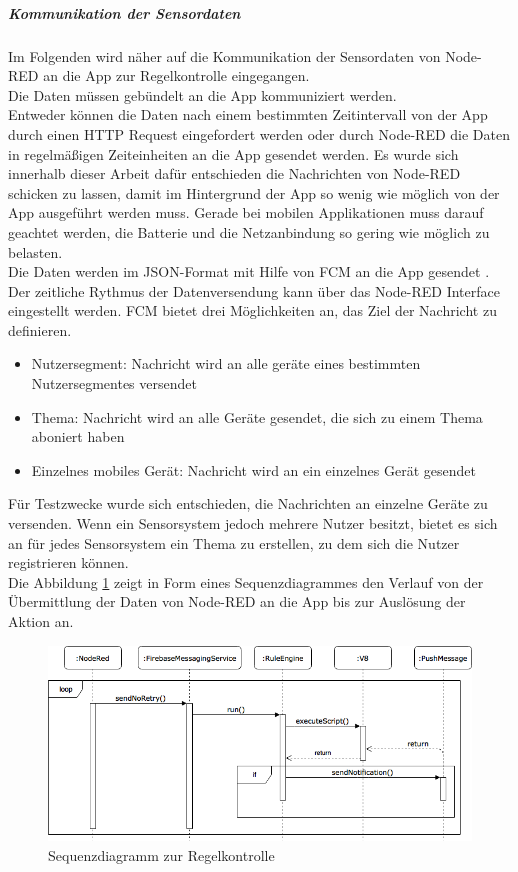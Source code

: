 \subparagraph{Kommunikation der Sensordaten}
Im Folgenden wird näher auf die Kommunikation der Sensordaten von Node-RED an die App zur Regelkontrolle eingegangen.\\
Die Daten müssen gebündelt an die App kommuniziert werden.\\
Entweder können die Daten nach einem bestimmten Zeitintervall von der App durch einen HTTP Request eingefordert werden oder durch Node-RED die Daten in regelmäßigen Zeiteinheiten an die App gesendet werden. Es wurde sich innerhalb dieser Arbeit dafür entschieden die Nachrichten von Node-RED schicken zu lassen, damit im Hintergrund der App so wenig wie möglich von der App ausgeführt werden muss. Gerade bei mobilen Applikationen muss darauf geachtet werden, die Batterie und die Netzanbindung so gering wie möglich zu belasten. \\
Die Daten werden im JSON-Format mit Hilfe von \ac{FCM} an die App gesendet \cite{firebase:gcm}. Der zeitliche Rythmus der Datenversendung kann über das Node-RED Interface eingestellt werden. \ac{FCM} bietet drei Möglichkeiten an, das Ziel der Nachricht zu definieren.
\begin{itemize}
	\item Nutzersegment: Nachricht wird an alle geräte eines bestimmten Nutzersegmentes versendet
	\item Thema: Nachricht wird an alle Geräte gesendet, die sich zu einem Thema aboniert haben
	\item Einzelnes mobiles Gerät: Nachricht wird an ein einzelnes Gerät gesendet
\end{itemize}
Für Testzwecke wurde sich entschieden, die Nachrichten an einzelne Geräte zu versenden. Wenn ein Sensorsystem jedoch mehrere Nutzer besitzt, bietet es sich an für jedes Sensorsystem ein Thema zu erstellen, zu dem sich die Nutzer registrieren können.\\
Die Abbildung \ref{fig:sequenzdiagramm} zeigt in Form eines Sequenzdiagrammes den Verlauf von der Übermittlung
der Daten von Node-RED an die App bis zur Auslösung der Aktion an.
\begin{figure}
	\centering
	\includegraphics[width=1\textwidth]{images/Sequenzdiagramm.png}
	\caption{Sequenzdiagramm zur Regelkontrolle}
	\label{fig:sequenzdiagramm}
\end{figure}


